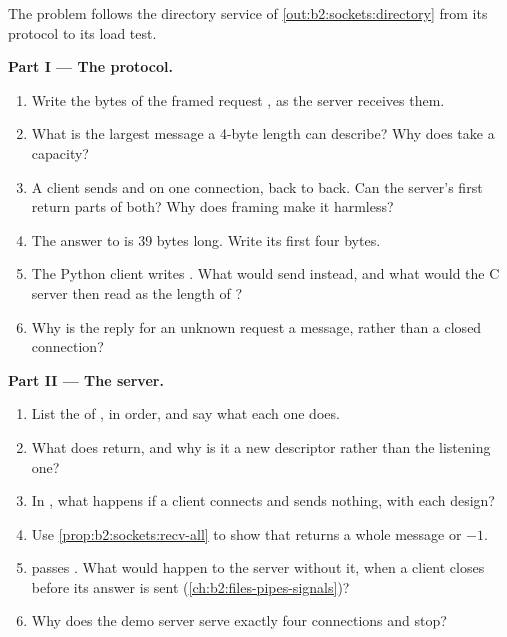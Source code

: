 \begin{problem}\label{pb:b2:sockets:1}
The problem follows the directory service of \cref{out:b2:sockets:directory} from its protocol to its load test.

\medskip\noindent\textbf{Part I --- The protocol.}\par\nopagebreak
\begin{enumerate}
\item Write the bytes of the framed request , as the server receives them.
\item What is the largest message a 4-byte length can describe? Why does  take a capacity?
\item A client sends  and  on one connection, back to back. Can the server's first
 return parts of both? Why does framing make it harmless?
\item The answer to  is 39 bytes long. Write its first four bytes.
\item The Python client writes . What would  send instead, and what would the C
server then read as the length of ?
\item Why is the reply for an unknown request a message, rather than a closed connection?
\end{enumerate}

\medskip\noindent\textbf{Part II --- The server.}\par\nopagebreak
\begin{enumerate}[resume, beginpenalty=10000]
\item List the  of , in order, and say what each one does.
\item What does  return, and why is it a new descriptor rather than the listening one?
\item In , what happens if a client connects and sends nothing, with each design?
\item Use \cref{prop:b2:sockets:recv-all} to show that  returns a whole message or $-1$.
\item {} passes . What would happen to the server without it, when a client closes
before its answer is sent (\cref{ch:b2:files-pipes-signals})?
\item Why does the demo server serve exactly four connections and stop?
\end{enumerate}


\end{problem}
